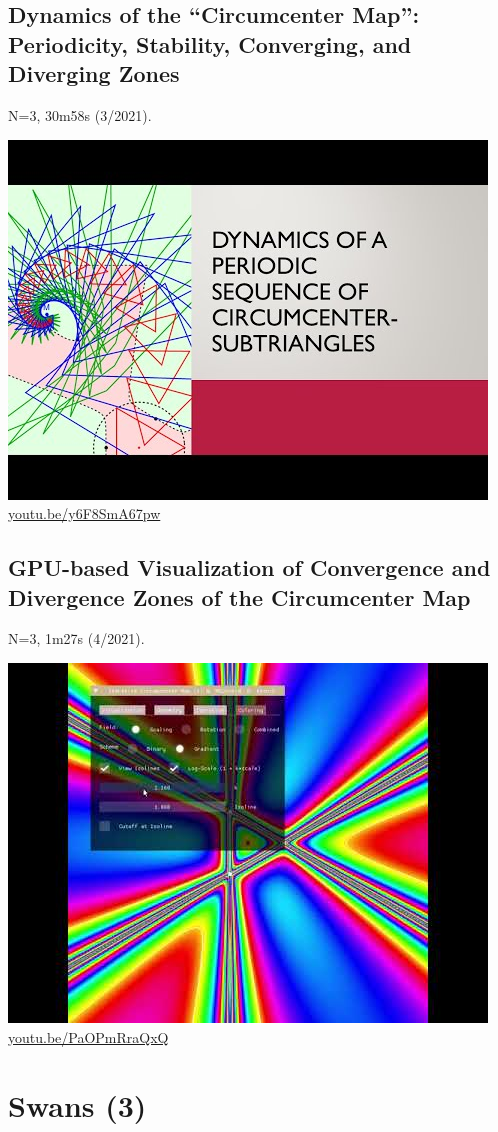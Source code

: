 \documentclass[12pt]{amsart}
\begin{document}
\subsection{Dynamics of the ``Circumcenter Map'': Periodicity, Stability, Converging, and Diverging Zones}
\label{vid:y6F8SmA67pw}
\noindent N=3, 30m58s (3/2021). 
\begin{center}\includegraphics[width=.5\textwidth]{pics/y6F8SmA67pw.jpg} \\ 
\href{https://youtu.be/y6F8SmA67pw}{\url{youtu.be/y6F8SmA67pw}}\end{center}
% 
\subsection{GPU-based Visualization of Convergence and Divergence Zones of the Circumcenter Map}
\label{vid:PaOPmRraQxQ}
\noindent N=3, 1m27s (4/2021). 
\begin{center}\includegraphics[width=.5\textwidth]{pics/PaOPmRraQxQ.jpg} \\ 
\href{https://youtu.be/PaOPmRraQxQ}{\url{youtu.be/PaOPmRraQxQ}}\end{center}
% 

\section{Swans (3)}
\end{document}
